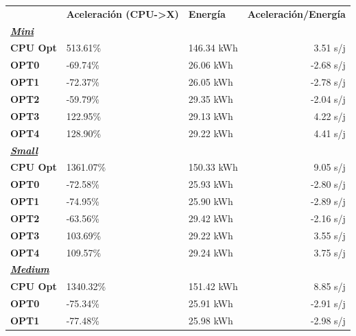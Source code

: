 \begin{table}[H]
    \centering
    \begin{tabular}{lllr}
    \rowcolor[HTML]{DAE8FC} \ & \textbf{Aceleración (CPU->X)} & \textbf{	Energía} & \textbf{	Aceleración/Energía} \\
    \cellcolor[HTML]{DAE8FC} \textbf{\textbf{{\emph{{\underline{{Mini}}}}}}} & &	&	 \\
    \rowcolor[HTML]{EFEFEF} \cellcolor[HTML]{DAE8FC} \textbf{CPU Opt} &513.61\%  &	146.34 kWh  &	3.51 s/j \\
    \cellcolor[HTML]{DAE8FC} \textbf{OPT0} & -69.74\%  &	26.06 kWh  &	-2.68 s/j \\
    \rowcolor[HTML]{EFEFEF} \cellcolor[HTML]{DAE8FC} \textbf{OPT1} &-72.37\%  &	26.05 kWh  &	-2.78 s/j \\
    \cellcolor[HTML]{DAE8FC} \textbf{OPT2} & -59.79\%  &	29.35 kWh  &	-2.04 s/j \\
    \rowcolor[HTML]{EFEFEF} \cellcolor[HTML]{DAE8FC} \textbf{OPT3} &122.95\%  &	29.13 kWh  &	4.22 s/j \\
    \cellcolor[HTML]{DAE8FC} \textbf{OPT4} & 128.90\%  &	29.22 kWh  &	4.41 s/j \\
    \rowcolor[HTML]{EFEFEF} \cellcolor[HTML]{DAE8FC} \textbf{\textbf{{\emph{{\underline{{Small}}}}}}} &&	&	 \\
    \cellcolor[HTML]{DAE8FC} \textbf{CPU Opt} & 1361.07\%  &	150.33 kWh  &	9.05 s/j \\
    \rowcolor[HTML]{EFEFEF} \cellcolor[HTML]{DAE8FC} \textbf{OPT0} &-72.58\%  &	25.93 kWh  &	-2.80 s/j \\
    \cellcolor[HTML]{DAE8FC} \textbf{OPT1} & -74.95\%  &	25.90 kWh  &	-2.89 s/j \\
    \rowcolor[HTML]{EFEFEF} \cellcolor[HTML]{DAE8FC} \textbf{OPT2} &-63.56\%  &	29.42 kWh  &	-2.16 s/j \\
    \cellcolor[HTML]{DAE8FC} \textbf{OPT3} & 103.69\%  &	29.22 kWh  &	3.55 s/j \\
    \rowcolor[HTML]{EFEFEF} \cellcolor[HTML]{DAE8FC} \textbf{OPT4} &109.57\%  &	29.24 kWh  &	3.75 s/j \\
    \cellcolor[HTML]{DAE8FC} \textbf{\textbf{{\emph{{\underline{{Medium}}}}}}} & &	&	 \\
    \rowcolor[HTML]{EFEFEF} \cellcolor[HTML]{DAE8FC} \textbf{CPU Opt} &1340.32\%  &	151.42 kWh  &	8.85 s/j \\
    \cellcolor[HTML]{DAE8FC} \textbf{OPT0} & -75.34\%  &	25.91 kWh  &	-2.91 s/j \\
    \rowcolor[HTML]{EFEFEF} \cellcolor[HTML]{DAE8FC} \textbf{OPT1} &-77.48\%  &	25.98 kWh  &	-2.98 s/j \\

\end{tabular}
\end{table}
